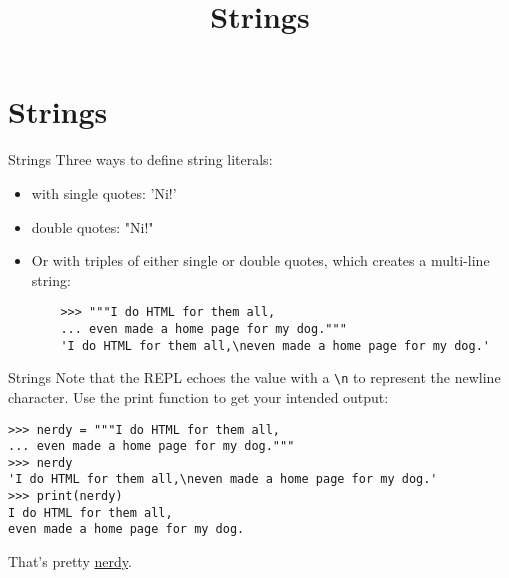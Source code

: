 \documentclass[smaller, aspectratio=1610]{beamer}
\date{}
\title{Strings}
\begin{document}
\maketitle


\section{Strings}
\label{sec:orgff12cda}

\begin{frame}[label={sec:org44313ee},fragile]{Strings}
 Three ways to define string literals:

\begin{itemize}
\item with single quotes: 'Ni!'

\item double quotes: "Ni!"

\item Or with triples of either single or double quotes, which creates a multi-line string:

\lstset{language=Python,label= ,caption= ,captionpos=b,numbers=none}
\begin{lstlisting}
    >>> """I do HTML for them all,
    ... even made a home page for my dog."""
    'I do HTML for them all,\neven made a home page for my dog.'
\end{lstlisting}
\end{itemize}
\end{frame}

\begin{frame}[label={sec:orgb27290c},fragile]{Strings}
 Note that the REPL echoes the value with a \texttt{\textbackslash{}n} to represent the newline character. Use the print function to get your intended output:

\lstset{language=Python,label= ,caption= ,captionpos=b,numbers=none}
\begin{lstlisting}
>>> nerdy = """I do HTML for them all,
... even made a home page for my dog."""
>>> nerdy
'I do HTML for them all,\neven made a home page for my dog.'
>>> print(nerdy)
I do HTML for them all,
even made a home page for my dog.
\end{lstlisting}

That's pretty \href{http://bravehunde.org}{nerdy}.
\end{frame}
\end{document}
